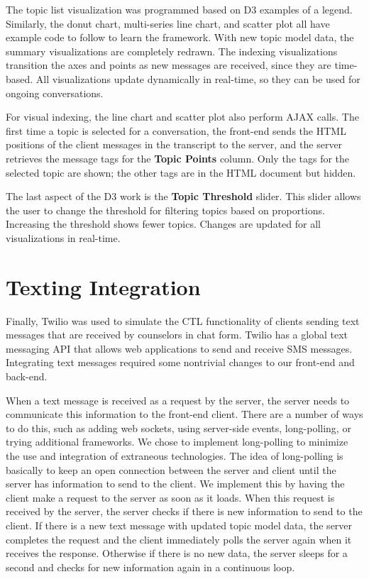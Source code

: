 The topic list visualization was programmed based on D3 examples of a legend. Similarly, the donut chart, multi-series line chart, and scatter plot all have example code to follow to learn the framework. With new topic model data, the summary visualizations are completely redrawn. The indexing visualizations transition the axes and points as new messages are received, since they are time-based. All visualizations update dynamically in real-time, so they can be used for ongoing conversations.

For visual indexing, the line chart and scatter plot also perform AJAX calls. The first time a topic is selected for a conversation, the front-end sends the HTML positions of the client messages in the transcript to the server, and the server retrieves the message tags for the \textbf{Topic Points} column. Only the tags for the selected topic are shown; the other tags are in the HTML document but hidden.

The last aspect of the D3 work is the \textbf{Topic Threshold} slider. This slider allows the user to change the threshold for filtering topics based on proportions. Increasing the threshold shows fewer topics. Changes are updated for all visualizations in real-time.

\section{Texting Integration}

Finally, Twilio was used to simulate the CTL functionality of clients sending text messages that are received by counselors in chat form. Twilio has a global text messaging API that allows web applications to send and receive SMS messages. Integrating text messages required some nontrivial changes to our front-end and back-end.

When a text message is received as a request by the server, the server needs to communicate this information to the front-end client. There are a number of ways to do this, such as adding web sockets, using server-side events, long-polling, or trying additional frameworks. We chose to implement long-polling to minimize the use and integration of extraneous technologies. The idea of long-polling is basically to keep an open connection between the server and client until the server has information to send to the client. We implement this by having the client make a request to the server as soon as it loads. When this request is received by the server, the server checks if there is new information to send to the client. If there is a new text message with updated topic model data, the server completes the request and the client immediately polls the server again when it receives the response. Otherwise if there is no new data, the server sleeps for a second and checks for new information again in a continuous loop.

